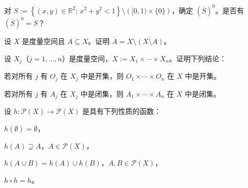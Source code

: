 \begin{exercises}
\begin{items}
\end{items}

\item

对 $S := \left\{ (x, y) \in \mathbb{R}^2 ; \, x^2 + y^2 < 1 \right\} \setminus \left([0,1) \times \{0\}\right)$，确定 $(\overline{S})^0$。是否有 $(\overline{S})^0 = S$？

\item

设 $X$ 是度量空间且 $A \subseteq X$。证明 $\mathring{A} = X \setminus \overline{(X \setminus A)}$。

\item

设 $ X_j $（$ j = 1, \ldots, n $）是度量空间，$ X := X_1 \times \cdots \times X_n $。证明下列结论：

\begin{items}
\item

若对所有 $j$ 有 $O_j$ 在 $X_j$ 中是开集，则 $O_1 \times \cdots \times O_n$ 在 $X$ 中是开集。

\item

若对所有 $j$ 有 $A_{j}$ 在 $X_{j}$ 中是闭集，则 $A_{1} \times \cdots \times A_{n}$ 在 $X$ 中是闭集。

\end{items}

\item

设 $ h: \mathcal{P}(X) \to \mathcal{P}(X) $ 是具有下列性质的函数：

\begin{subitems}
\item

$ h(\emptyset) = \emptyset $，

\item

$ h(A) \supseteq A $，$ A \in \mathcal{P}(X) $，

\item

$ h(A \cup B) = h(A) \cup h(B) $，$ A, B \in \mathcal{P}(X) $，

\item

$ h \circ h = h $。

\end{subitems}

\begin{items}
\item


\end{items}
\end{exercises}
